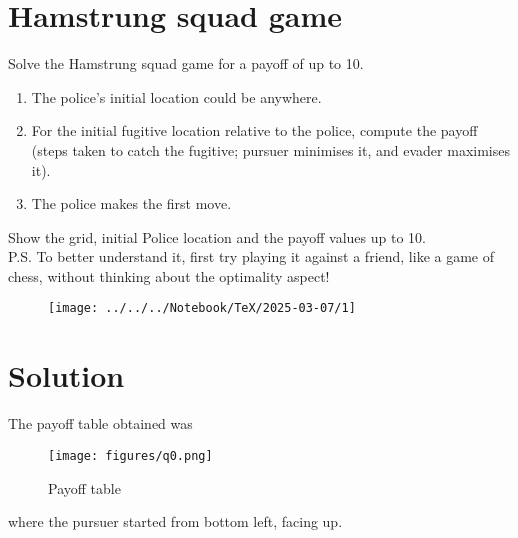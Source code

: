 \section*{Hamstrung squad game}

Solve the Hamstrung squad game for a payoff of up to 10.
\begin{enumerate}[noitemsep, topsep=0pt]
      \item The police's initial location could be anywhere.
      \item For the initial fugitive location relative to the police, compute the payoff (steps taken to catch the fugitive; pursuer minimises it, and evader maximises it).
      \item The police makes the first move.
\end{enumerate}
Show the grid, initial Police location and the payoff values up to 10. \\
P.S. To better understand it, first try playing it against a friend, like a game of chess, without thinking about the optimality aspect!

\begin{figure}[htbp]
      \centering
      \texttt{[image: ../../../Notebook/TeX/2025-03-07/1]}
\end{figure}

\clearpage
\section*{Solution}

The payoff table obtained was

\begin{figure}[htbp]
      \centering
      \texttt{[image: figures/q0.png]}
      \caption{Payoff table}
\end{figure}

where the pursuer started from bottom left, facing up.
